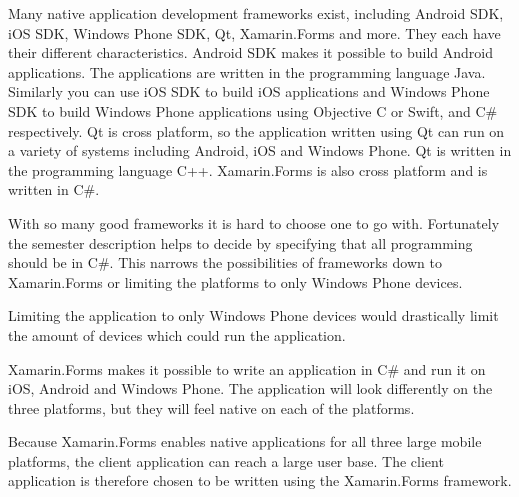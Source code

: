 \label{par:native_application_development_framework}

Many native application development frameworks exist, including Android SDK, iOS SDK, Windows Phone SDK, Qt, Xamarin.Forms and more. They each have their different characteristics. Android SDK makes it possible to build Android applications. The applications are written in the programming language Java. Similarly you can use iOS SDK to build iOS applications and Windows Phone SDK to build Windows Phone applications using Objective C or Swift, and C\# respectively. Qt is cross platform, so the application written using Qt can run on a variety of systems including Android, iOS and Windows Phone. Qt is written in the programming language C++. Xamarin.Forms is also cross platform and is written in C\#.

With so many good frameworks it is hard to choose one to go with. Fortunately the semester description helps to decide by specifying that all programming should be in C\#. This narrows the possibilities of frameworks down to Xamarin.Forms or limiting the platforms to only Windows Phone devices.

Limiting the application to only Windows Phone devices would drastically limit the amount of devices which could run the application.

Xamarin.Forms makes it possible to write an application in C\# and run it on iOS, Android and Windows Phone. The application will look differently on the three platforms, but they will feel native on each of the platforms.

Because Xamarin.Forms enables native applications for all three large mobile platforms, the client application can reach a large user base. The client application is therefore chosen to be written using the Xamarin.Forms framework.
